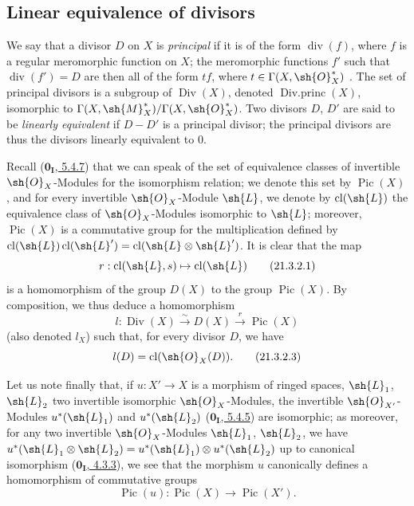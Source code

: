 \subsection{Linear equivalence of divisors}
\label{subsection:IV.21.3}

\begin{env}[21.3.1]
\label{IV.21.3.1}
We say that a divisor $D$ on $X$ is \emph{principal} if it is of the form $\operatorname{div}(f)$, where $f$ is a regular meromorphic function on $X$;
the meromorphic functions $f'$ such that $\operatorname{div}(f')=D$ are then all of the form $tf$, where $t\in\Gamma(X,\sh{O}_X^*)$ .
The set of principal divisors is a subgroup of $\operatorname{Div}(X)$, denoted $\operatorname{Div.princ}(X)$, isomorphic to $\Gamma(X,\sh{M}_X^*)/\Gamma(X,\sh{O}_X^*)$.
Two divisors $D$, $D'$ are said to be \emph{linearly equivalent} if $D-D'$ is a principal divisor;
the principal divisors are thus the divisors linearly equivalent to $0$.
\end{env}


\begin{env}[21.3.2]
\label{IV.21.3.2}
Recall (\hyperref[0.5.4.7]{$\mathbf{0_I}$, 5.4.7}) that we can speak of the set of equivalence classes of invertible $\sh{O}_X$-Modules for the isomorphism relation;
we denote this set by $\operatorname{Pic}(X)$, and for every invertible $\sh{O}_X$-Module $\sh{L}$, we denote by $\operatorname{cl}(\sh{L})$ the equivalence class of $\sh{O}_X$-Modules isomorphic to $\sh{L}$;
moreover, $\operatorname{Pic}(X)$ is a commutative group for the multiplication defined by $\operatorname{cl}(\sh{L})\operatorname{cl}(\sh{L}')=\operatorname{cl}(\sh{L}\otimes\sh{L}')$.
It is clear that the map
\[
\label{IV.21.3.2.1}
  r:\operatorname{cl}(\sh{L},s)\mapsto\operatorname{cl}(\sh{L})
  \tag{21.3.2.1}
\]
is a homomorphism of the group $D(X)$  to the group $\operatorname{Pic}(X)$.
By composition, we thus deduce a homomorphism
\[
\label{IV.21.3.2.2}
  l:\operatorname{Div}(X)\xrightarrow{\sim}D(X)\xrightarrow{r}\operatorname{Pic}(X)
  \tag{21.3.2.2}
\]
(also denoted $l_X$) such that, for every divisor $D$, we have
\[
\label{IV.21.3.2.3}
  l(D)=\operatorname{cl}(\sh{O}_X(D)).
  \tag{21.3.2.3}
\]

Let us note finally that, if $u:X'\to X$ is a morphism of ringed spaces, $\sh{L}_1$, $\sh{L}_2$ two invertible isomorphic $\sh{O}_X$-Modules, the invertible $\sh{O}_{X'}$-Modules $u^*(\sh{L}_1)$ and $u^*(\sh{L}_2)$ (\hyperref[0.5.4.5]{$\mathbf{0_I}$, 5.4.5}) are isomorphic;
as moreover, for any two invertible $\sh{O}_X$-Modules $\sh{L}_1$, $\sh{L}_2$, we have $u^*(\sh{L}_1\otimes\sh{L}_2)=u^*(\sh{L}_1)\otimes u^*(\sh{L}_2)$ up to canonical isomorphism (\hyperref[0.4.3.3]{$\mathbf{0_I}$, 4.3.3}), we see that the morphism $u$ canonically defines a homomorphism of commutative groups
\[
\label{IV.21.3.2.4}
  \operatorname{Pic}(u):\operatorname{Pic}(X)\to\operatorname{Pic}(X').
  \tag{21.3.2.4}
\]
\end{env}

